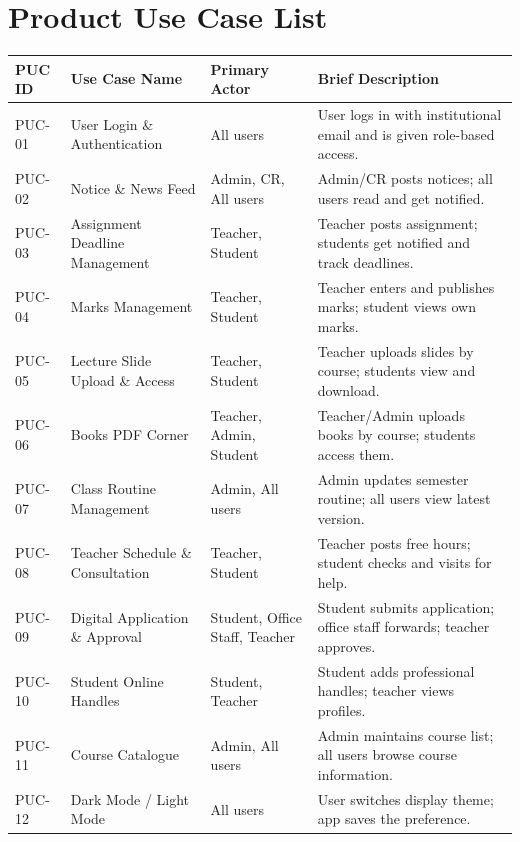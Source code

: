 \documentclass[12pt,a4paper]{article}
\newcommand{\THH}[1]{\small\bfseries\color{white} #1}
\begin{document}
\newpage
\section{Product Use Case List}

\vspace{0.4em}
\begin{longtable}{|>{\centering\arraybackslash}p{1.5cm}|p{5cm}|p{3cm}|p{4.5cm}|}
\hline
\rowcolor{navyblue}
\THH{PUC ID} & \THH{Use Case Name} & \THH{Primary Actor} & \THH{Brief Description} \\
\hline
\endhead
PUC-01 & User Login \& Authentication & All users & User logs in with institutional email and is given role-based access. \\
\hline
PUC-02 & Notice \& News Feed & Admin, CR, All users & Admin/CR posts notices; all users read and get notified. \\
\hline
PUC-03 & Assignment Deadline Management & Teacher, Student & Teacher posts assignment; students get notified and track deadlines. \\
\hline
PUC-04 & Marks Management & Teacher, Student & Teacher enters and publishes marks; student views own marks. \\
\hline
PUC-05 & Lecture Slide Upload \& Access & Teacher, Student & Teacher uploads slides by course; students view and download. \\
\hline
PUC-06 & Books PDF Corner & Teacher, Admin, Student & Teacher/Admin uploads books by course; students access them. \\
\hline
PUC-07 & Class Routine Management & Admin, All users & Admin updates semester routine; all users view latest version. \\
\hline
PUC-08 & Teacher Schedule \& Consultation & Teacher, Student & Teacher posts free hours; student checks and visits for help. \\
\hline
PUC-09 & Digital Application \& Approval & Student, Office Staff, Teacher & Student submits application; office staff forwards; teacher approves. \\
\hline
PUC-10 & Student Online Handles & Student, Teacher & Student adds professional handles; teacher views profiles. \\
\hline
PUC-11 & Course Catalogue & Admin, All users & Admin maintains course list; all users browse course information. \\
\hline
PUC-12 & Dark Mode / Light Mode & All users & User switches display theme; app saves the preference. \\
\hline
\end{longtable}
\end{document}
